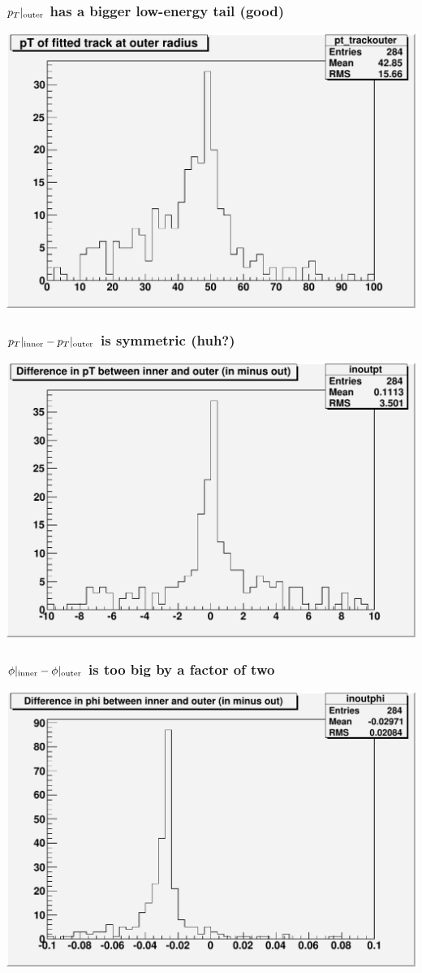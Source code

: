 \documentclass[12pt,compress]{beamer}
\begin{document}
\begin{frame}
\frametitle{$p_T|_{\mbox{\scriptsize outer}}$ has a bigger low-energy tail (good)}
\begin{center}
\includegraphics[width=0.8\linewidth]{pt_trackouter}
\end{center}
\end{frame}

\begin{frame}
\frametitle{$p_T|_{\mbox{\scriptsize inner}} - p_T|_{\mbox{\scriptsize outer}}$ is symmetric (huh?)}
\begin{center}
\includegraphics[width=0.8\linewidth]{inoutpt}
\end{center}
\end{frame}

\begin{frame}
\frametitle{$\phi|_{\mbox{\scriptsize inner}} - \phi|_{\mbox{\scriptsize outer}}$ is too big by a factor of two}
\begin{center}
\includegraphics[width=0.8\linewidth]{inoutphi}
\end{center}
\end{frame}
\end{document}
